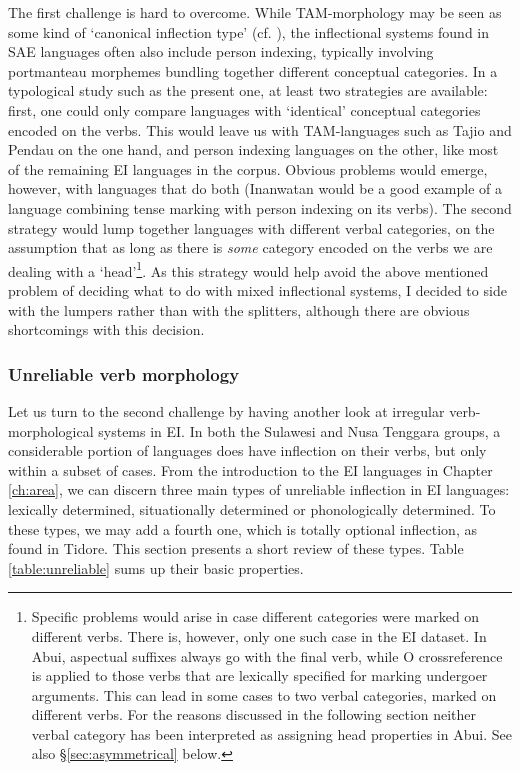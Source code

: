 The first challenge is hard to overcome. While TAM-morphology may be seen as some kind of `canonical inflection type' (cf. \citealt{foley2010events}), the inflectional systems found in SAE languages often also include person indexing, typically involving portmanteau morphemes bundling together different conceptual categories. In a typological study such as the present one, at least two strategies are available: first, one could only compare languages with `identical' conceptual categories encoded on the verbs. This would leave us with TAM-languages such as Tajio and Pendau on the one hand, and person indexing languages on the other, like most of the remaining EI languages in the corpus. Obvious problems would emerge, however, with languages that do both (Inanwatan would be a good example of a language combining tense marking with person indexing on its verbs). The second strategy would lump together languages with different verbal categories, on the assumption that as long as there is \emph{some} category encoded on the verbs we are dealing with a `head'\footnote{Specific problems would arise in case different categories were marked on different verbs. There is, however, only one such case in the EI dataset. In Abui, aspectual suffixes always go with the final verb, while O crossreference is applied to those verbs that are lexically specified for marking undergoer arguments. This can lead in some cases to two verbal categories, marked on different verbs. For the reasons discussed in the following section neither verbal category has been interpreted as assigning head properties in Abui. See also §\ref{sec:asymmetrical} below.}. As this strategy would help avoid the above mentioned problem of deciding what to do with mixed inflectional systems, I decided to side with the lumpers rather than with the splitters, although there are obvious shortcomings with this decision. 
 
\subsubsection{Unreliable verb morphology} \label{sec:unreliable}

Let us turn to the second challenge by having another look at irregular verb-morphological systems in EI. In both the Sulawesi and Nusa Tenggara groups, a considerable portion of languages does have inflection on their verbs, but only within a subset of cases. From the introduction to the EI languages in Chapter \ref{ch:area}, we can discern three main types of unreliable inflection in EI languages: lexically determined, situationally determined or phonologically determined. To these types, we may add a fourth one, which is totally optional inflection, as found in Tidore. This section presents a short review of these types. Table \ref{table:unreliable} sums up their basic properties.

